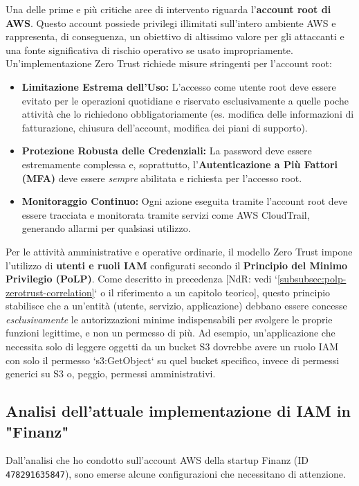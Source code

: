 Una delle prime e più critiche aree di intervento riguarda l'\textbf{account root di AWS}. Questo account possiede privilegi illimitati sull'intero ambiente AWS e rappresenta, di conseguenza, un obiettivo di altissimo valore per gli attaccanti e una fonte significativa di rischio operativo se usato impropriamente. Un'implementazione Zero Trust richiede misure stringenti per l'account root:
\begin{itemize}
    \item \textbf{Limitazione Estrema dell'Uso:} L'accesso come utente root deve essere evitato per le operazioni quotidiane e riservato esclusivamente a quelle poche attività che lo richiedono obbligatoriamente (es. modifica delle informazioni di fatturazione, chiusura dell'account, modifica dei piani di supporto).
    \item \textbf{Protezione Robusta delle Credenziali:} La password deve essere estremamente complessa e, soprattutto, l'\textbf{Autenticazione a Più Fattori (MFA)} deve essere \textit{sempre} abilitata e richiesta per l'accesso root.
    \item \textbf{Monitoraggio Continuo:} Ogni azione eseguita tramite l'account root deve essere tracciata e monitorata tramite servizi come AWS CloudTrail, generando allarmi per qualsiasi utilizzo.
\end{itemize}

Per le attività amministrative e operative ordinarie, il modello Zero Trust impone l'utilizzo di \textbf{utenti e ruoli IAM} configurati secondo il \textbf{Principio del Minimo Privilegio (PoLP)}. Come descritto in precedenza [NdR: vedi `\ref{subsubsec:polp-zerotrust-correlation}` o il riferimento a un capitolo teorico], questo principio stabilisce che a un'entità (utente, servizio, applicazione) debbano essere concesse \textit{esclusivamente} le autorizzazioni minime indispensabili per svolgere le proprie funzioni legittime, e non un permesso di più. Ad esempio, un'applicazione che necessita solo di leggere oggetti da un bucket S3 dovrebbe avere un ruolo IAM con solo il permesso `s3:GetObject` su quel bucket specifico, invece di permessi generici su S3 o, peggio, permessi amministrativi.

\subsection{Analisi dell'attuale implementazione di IAM in "Finanz"}
Dall'analisi che ho condotto sull'account AWS della startup Finanz (ID \texttt{478291635847}), sono emerse alcune configurazioni che necessitano di attenzione.

